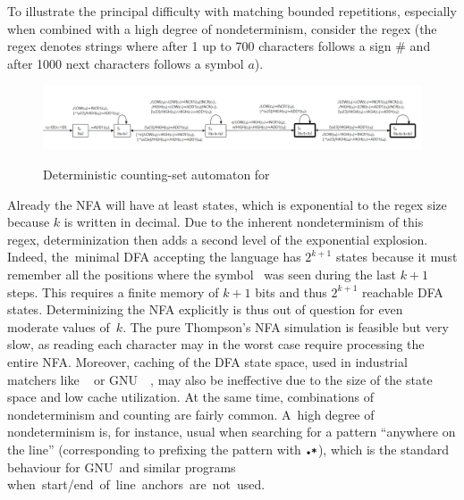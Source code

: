 \documentclass[acmsmall,screen]{acmart}
\begin{document}
To illustrate the principal difficulty with matching bounded repetitions,
especially when combined with a high degree of nondeterminism, 
consider the regex 
(the regex denotes strings where after 1 up to 700 characters follows a sign $\#$ and after 1000 next characters follows a symbol $a$).

\begin{figure}
    \centering
    \caption{Deterministic counting-set automaton for }
    \includegraphics[width=0.9\linewidth]{./figures/dca.png}
    \label{fig:ak:dca}
\end{figure}


Already the NFA will have at least 
states, which is exponential to the regex
size because $k$ is written in decimal. 
%
Due to the inherent nondeterminism of this regex, determinization then adds a second level of the exponential explosion.  
Indeed, the~minimal DFA accepting
the language has $2^{k+1}$ states because it must remember all the
positions where the symbol~ was seen during the last $k+1$ steps.  This
requires a finite memory of $k+1$ bits and thus $2^{k+1}$ reachable
DFA states. 
Determinizing the NFA explicitly is thus out of question for even moderate values
of~$k$. 
The pure Thompson's NFA simulation is feasible but very 
slow, as reading each character may in the
worst case require processing the entire NFA.
Moreover, caching of the DFA state space, used in industrial
matchers like
\retwo~\cite{re2} or GNU~\grep~\cite{grep},
may also be ineffective due to the size of the state space and
low cache utilization.
At the same time, combinations of nondeterminism and counting are
fairly common. A~high degree of nondeterminism is, for instance, usual when
searching for a pattern ``anywhere on the line'' (corresponding to prefixing the
pattern with $\regex{\DOT*}$), which is the standard behaviour for GNU~\grep and
similar programs \mbox{when start/end of line anchors are not used.}
\end{document}
